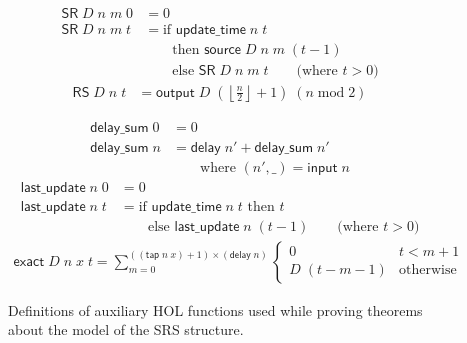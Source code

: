 \documentclass{llncs}
\begin{document}
\begin{figure}
\begin{align*}
\end{align*}
\begin{align*}
\mathsf{SR}\;D\;n\;m\;0&=0\\
\mathsf{SR}\;D\;n\;m\;t&=\text{if $\mathsf{update\_time}\;n\;t$}\\
&\qquad\text{then }\mathsf{source}\;D\;n\;m\;(t-1)\\
&\qquad\text{else }\mathsf{SR}\;D\;n\;m\;t\qquad\text{(where $t>0$)}
\end{align*}
\begin{align*}
\mathsf{RS}\;D\;n\;t&=\mathsf{output}\;D\;\left(\left\lfloor\frac{n}{2}\right\rfloor+1\right)\;(n\operatorname{mod}2)
\end{align*}
\end{figure}

\begin{figure}
\caption{
Definitions of auxiliary HOL functions used while proving theorems about the model of the SRS structure.
\label{fig:auxdefs}
}
\begin{align*}
\mathsf{delay\_sum}\;0&=0\\
\mathsf{delay\_sum}\;n&=\mathsf{delay}\;n'+\mathsf{delay\_sum}\;n'\\
&\qquad\text{where $(n',\_)=\mathsf{input}\;n$}
\end{align*}
\begin{align*}
\mathsf{last\_update}\;n\;0&=0\\
\mathsf{last\_update}\;n\;t&=\text{if $\mathsf{update\_time}\;n\;t$ then $t$}\\
&\qquad\text{else }\mathsf{last\_update}\;n\;(t-1)\qquad\text{(where $t>0$)}
\end{align*}
\begin{align*}
\mathsf{exact}\;D\;n\;x\;t=\sum_{m=0}^{((\mathsf{tap}\;n\;x)+1)\times(\mathsf{delay}\;n)}\begin{cases}0&t<m+1\\D\;(t-m-1)&\text{otherwise}\end{cases}
\end{align*}
\end{figure}
\end{document}
